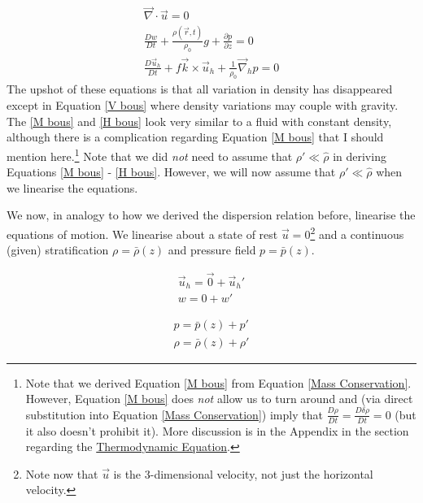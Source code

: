 \begin{gather}
    \label{M bous}
    \boxed{
        \vec{\nabla}\cdot\vec{u}=0
    }
    \\
    \label{V bous}
    \boxed{\frac{Dw}{Dt}
    +
    \frac{\rho(\vec{r},t)}{\rho_0}g + \frac{\partial p}{\partial z}= 0}
    \\
    \label{H bous}
    \boxed{
        \frac{D\vec{u}_h}{Dt}+f\vec{k}\times\vec{u}_h + \frac{1}{\rho_0}\vec{\nabla}_h p = 0
    }
\end{gather}
The upshot of these equations is that all variation in density has disappeared except in Equation \ref{V bous} where density variations may couple with gravity. The \ref{M bous} and \ref{H bous} look very similar to a fluid with constant density, although there is a complication regarding Equation \ref{M bous} that I should mention here.\footnote{
    Note that we derived Equation \ref{M bous} from Equation \ref{Mass Conservation}. However, Equation \ref{M bous} does \textit{not} allow us to turn around and (via direct substitution into Equation \ref{Mass Conservation}) imply that \(\frac{D\rho}{Dt} = \frac{D\delta \rho}{Dt} = 0\) (but it also doesn't prohibit it). More discussion is in the Appendix in the section regarding the \hyperref[Appendix Thermodynamic Eqn]{Thermodynamic Equation}.
} Note that we did \textit{not} need to assume that \(\rho'\ll \hat{\rho}\) in deriving Equations \ref{M bous} - \ref{H bous}. However, we will now assume that \(\rho'\ll \hat{\rho}\) when we linearise the equations.

We now, in analogy to how we derived the dispersion relation before, linearise the equations of motion. We linearise about a state of rest \(\vec{u}=0\)\footnote{Note now that \(\vec{u}\) is the 3-dimensional velocity, not just the horizontal velocity.} and a continuous (given) stratification \(\rho=\bar{\rho}(z)\) and pressure field \(p=\bar{p}(z)\).

\vspace{-4mm}
\begin{minipage}{0.48\linewidth}
    \begin{align*}
        \vec{u}_h = \vec{0}+\vec{u}_h'\\
        w = 0 + w'
    \end{align*}
\end{minipage}
\hfill
\begin{minipage}{0.48\linewidth}
    \begin{align*}
        p = \bar{p}(z)+p'\\
        \rho = \bar{\rho}(z) + \rho'
    \end{align*}
\end{minipage}

